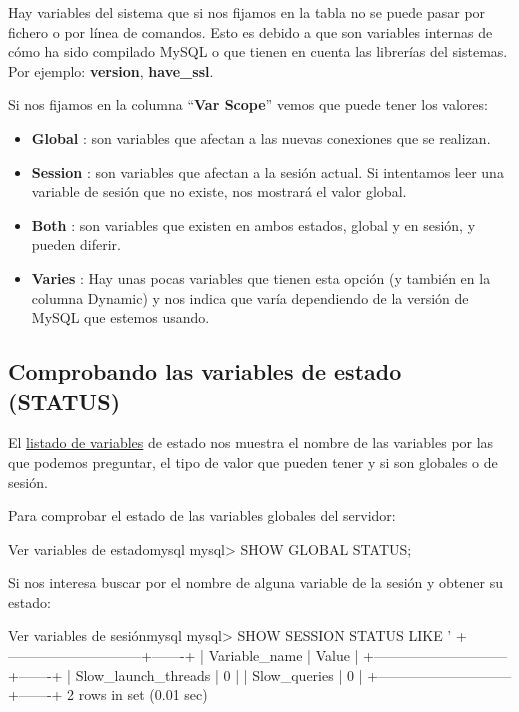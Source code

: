 Hay variables del sistema que si nos fijamos en la tabla no se puede pasar por fichero o por línea de comandos. Esto es debido a que son variables internas de cómo ha sido compilado MySQL o que tienen en cuenta las librerías del sistemas. Por ejemplo: \textbf{version}, \textbf{have\_ssl}.

Si nos fijamos en la columna “\textbf{Var Scope}” vemos que puede tener los valores:

\begin{itemize}
    \item \textbf{Global} : son variables que afectan a las nuevas conexiones que se realizan.
    \item \textbf{Session} : son variables que afectan a la sesión actual. Si intentamos leer una variable de sesión que no existe, nos mostrará el valor global.
    \item \textbf{Both} : son variables que existen en ambos estados, global y en sesión, y pueden diferir.
    \item \textbf{Varies} : Hay unas pocas variables que tienen esta opción (y también en la columna Dynamic) y nos indica que varía dependiendo de la versión de MySQL que estemos usando.
\end{itemize}

\subsection{Comprobando las variables de estado (STATUS)}
El \href{https://dev.mysql.com/doc/refman/8.0/en/server-status-variable-reference.html}{listado de variables} de estado nos muestra el nombre de las variables por las que podemos preguntar, el tipo de valor que pueden tener y si son globales o de sesión.

Para comprobar el estado de las variables globales del servidor:

\begin{mycode}{Ver variables de estado}{mysql}{}
mysql> SHOW GLOBAL STATUS;
\end{mycode}

Si nos interesa buscar por el nombre de alguna variable de la sesión y obtener su estado:

\begin{mycode}{Ver variables de sesión}{mysql}{}
mysql> SHOW SESSION STATUS LIKE '%
+-----------------------------+-------+
| Variable_name               | Value |
+-----------------------------+-------+
| Slow_launch_threads         | 0     |
| Slow_queries                | 0     |
+-----------------------------+-------+
2 rows in set (0.01 sec)
\end{mycode}

